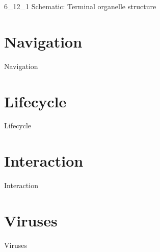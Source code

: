 \documentclass[]{tufte-book}
\begin{document}
6\_12\_1 Schematic: Terminal organelle structure

\chapter{Navigation}\label{navigation}

Navigation

\chapter{Lifecycle}\label{lifecycle}

Lifecycle

\chapter{Interaction}\label{interaction}

Interaction

\chapter{Viruses}\label{viruses}

Viruses


\end{document}
